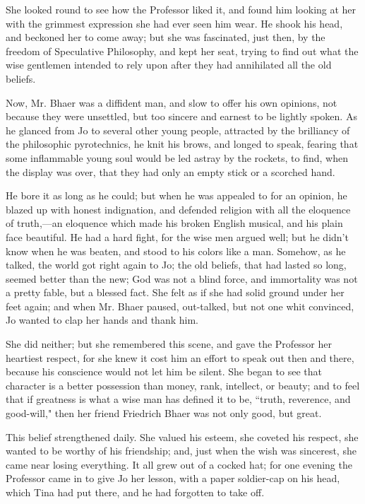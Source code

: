 She looked round to see how the Professor liked it, and found him
looking at her with the grimmest expression she had ever seen him wear.
He shook his head, and beckoned her to come away; but she was
fascinated, just then, by the freedom of Speculative Philosophy, and
kept her seat, trying to find out what the wise gentlemen intended to
rely upon after they had annihilated all the old beliefs.

Now, Mr. Bhaer was a diffident man, and slow to offer his own opinions,
not because they were unsettled, but too sincere and earnest to be
lightly spoken. As he glanced from Jo to several other young people,
attracted by the brilliancy of the philosophic pyrotechnics, he knit his
brows, and longed to speak, fearing that some inflammable young soul
would be led astray by the rockets, to find, when the display was over,
that they had only an empty stick or a scorched hand.

He bore it as long as he could; but when he was appealed to for an
opinion, he blazed up with honest indignation, and defended religion
with all the eloquence of truth,---an eloquence which made his broken
English musical, and his plain face beautiful. He had a hard fight, for
the wise men argued well; but he didn't know when he was
beaten, and stood to his colors like a man. Somehow, as he talked, the
world got right again to Jo; the old beliefs, that had lasted so long,
seemed better than the new; God was not a blind force, and immortality
was not a pretty fable, but a blessed fact. She felt as if she had solid
ground under her feet again; and when Mr. Bhaer paused, out-talked, but
not one whit convinced, Jo wanted to clap her hands and thank him.

She did neither; but she remembered this scene, and gave the Professor
her heartiest respect, for she knew it cost him an effort to speak out
then and there, because his conscience would not let him be silent. She
began to see that character is a better possession than money, rank,
intellect, or beauty; and to feel that if greatness is what a wise man
has defined it to be, ``truth, reverence, and good-will," then her friend
Friedrich Bhaer was not only good, but great.

This belief strengthened daily. She valued his esteem, she coveted his
respect, she wanted to be worthy of his friendship; and, just when the
wish was sincerest, she came near losing everything. It all grew out of
a cocked hat; for one evening the Professor came in to give Jo her
lesson, with a paper soldier-cap on his head, which Tina had put there,
and he had forgotten to take off.

